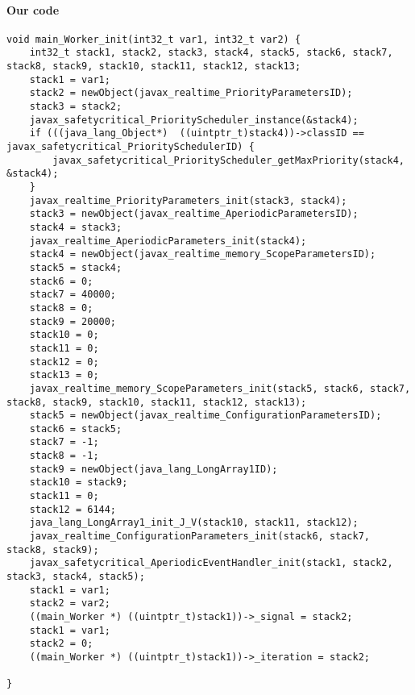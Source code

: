 \begin{landscape}
\begin{multicols}{2}
\paragraph{Our code}\hfill
\begin{lstlisting}[firstnumber=1574]
void main_Worker_init(int32_t var1, int32_t var2) {
	int32_t stack1, stack2, stack3, stack4, stack5, stack6, stack7, stack8, stack9, stack10, stack11, stack12, stack13;
	stack1 = var1;
	stack2 = newObject(javax_realtime_PriorityParametersID);
	stack3 = stack2;
	javax_safetycritical_PriorityScheduler_instance(&stack4);
	if (((java_lang_Object*)  ((uintptr_t)stack4))->classID == javax_safetycritical_PrioritySchedulerID) {
		javax_safetycritical_PriorityScheduler_getMaxPriority(stack4, &stack4);
	}
	javax_realtime_PriorityParameters_init(stack3, stack4);
	stack3 = newObject(javax_realtime_AperiodicParametersID);
	stack4 = stack3;
	javax_realtime_AperiodicParameters_init(stack4);
	stack4 = newObject(javax_realtime_memory_ScopeParametersID);
	stack5 = stack4;
	stack6 = 0;
	stack7 = 40000;
	stack8 = 0;
	stack9 = 20000;
	stack10 = 0;
	stack11 = 0;
	stack12 = 0;
	stack13 = 0;
	javax_realtime_memory_ScopeParameters_init(stack5, stack6, stack7, stack8, stack9, stack10, stack11, stack12, stack13);
	stack5 = newObject(javax_realtime_ConfigurationParametersID);
	stack6 = stack5;
	stack7 = -1;
	stack8 = -1;
	stack9 = newObject(java_lang_LongArray1ID);
	stack10 = stack9;
	stack11 = 0;
	stack12 = 6144;
	java_lang_LongArray1_init_J_V(stack10, stack11, stack12);
	javax_realtime_ConfigurationParameters_init(stack6, stack7, stack8, stack9);
	javax_safetycritical_AperiodicEventHandler_init(stack1, stack2, stack3, stack4, stack5);
	stack1 = var1;
	stack2 = var2;
	((main_Worker *) ((uintptr_t)stack1))->_signal = stack2;
	stack1 = var1;
	stack2 = 0;
	((main_Worker *) ((uintptr_t)stack1))->_iteration = stack2;

}
\end{lstlisting}


\end{multicols}
\end{landscape}

